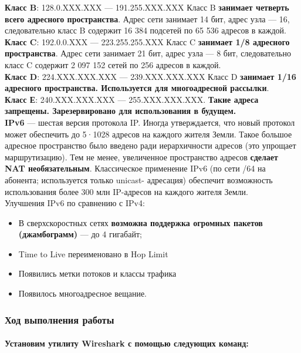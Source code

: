 \textbf{Класс B}: 128.0.XXX.XXX — 191.255.XXX.XXX
Класс B \textbf{занимает четверть всего адресного пространства}. Адрес сети занимает 14 бит, адрес узла — 16, следовательно класс B содержит 16 384 подсетей по 65 536 адресов в каждой.\\


\textbf{Класс C}: 192.0.0.XXX — 223.255.255.XXX
Класс C \textbf{занимает 1/8 адресного пространства}. Адрес сети занимает 21 бит, адрес узла — 8 бит, следовательно класс C содержит 2 097 152 сетей по 256 адресов в каждой.\\


\textbf{Класс D}: 224.XXX.XXX.XXX — 239.XXX.XXX.XXX
Класс D \textbf{занимает 1/16 адресного пространства. Используется для многоадресной рассылки}.\\


\textbf{Класс Е}: 240.XXX.XXX.XXX — 255.XXX.XXX.XXX.
\textbf{Такие адреса запрещены. Зарезервировано для использования в будущем.}\\


\textbf{IPv6} — шестая версия протокола IP. Иногда утверждается, что новый протокол может обеспечить до 5·1028 адресов на каждого жителя Земли. Такое большое адресное пространство было введено ради иерархичности адресов (это упрощает маршрутизацию). Тем не менее, увеличенное пространство адресов \textbf{сделает NAT необязательным}. Классическое применение IPv6 (по сети /64 на абонента; используется только unicast- адресация) обеспечит возможность использования более 300 млн IP-адресов на каждого жителя Земли.\\


Улучшения IPv6 по сравнению с IPv4:
\begin{itemize}
    \item В сверхскоростных сетях \textbf{возможна поддержка огромных пакетов (джамбограмм)} — до 4 гигабайт;
    \item Time to Live переименовано в Hop Limit
    \item Появились метки потоков и классы трафика
    \item Появилось многоадресное вещание.
\end{itemize}


\subsubsection{Ход выполнения работы}

\paragraph{Установим утилиту Wireshark с помощью следующих команд:}


